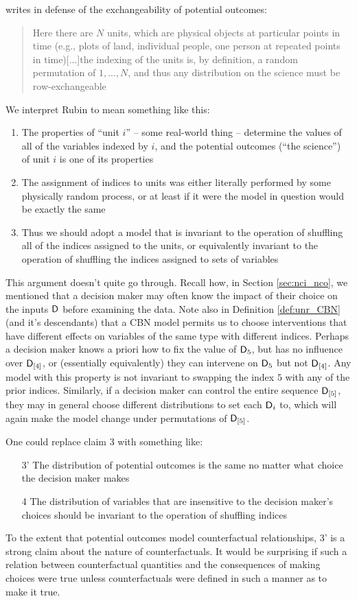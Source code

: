 \citet{rubin_causal_2005} writes in defense of the exchangeability of potential outcomes:
\begin{quote}
    Here there are $N$ units, which are physical objects at particular points in time (e.g., plots of land, individual people, one person at repeated points in time)[...]the indexing of the units is, by definition, a random permutation of $1,..., N$, and thus any distribution on the science must be row-exchangeable
\end{quote}
We interpret Rubin to mean something like this:
\begin{enumerate}
    \item The properties of ``unit $i$'' -- some real-world thing -- determine the values of all of the variables indexed by $i$, and the potential outcomes (``the science'') of unit $i$ is one of its properties
    \item The assignment of indices to units was either literally performed by some physically random process, or at least if it were the model in question would be exactly the same
    \item Thus we should adopt a model that is invariant to the operation of shuffling all of the indices assigned to the units, or equivalently invariant to the operation of shuffling the indices assigned to sets of variables
\end{enumerate}
This argument doesn't quite go through. Recall how, in Section \ref{sec:nci_nco}, we mentioned that a decision maker may often know the impact of their choice on the inputs $\mathsf{D}$ before examining the data. Note also in Definition \ref{def:unr_CBN} (and it's descendants) that a CBN model permits us to choose interventions that have different effects on variables of the same type with different indices. Perhaps a decision maker knows a priori how to fix the value of $\mathsf{D}_5$, but has no influence over $\mathsf{D}_{[4]}$, or (essentially equivalently) they can intervene on $\mathsf{D}_5$ but not $\mathsf{D}_{[4]}$. Any model with this property is not invariant to swapping the index $5$ with any of the prior indices. Similarly, if a decision maker can control the entire sequence $\mathsf{D}_{[5]}$, they may in general choose different distributions to set each $\mathsf{D}_i$ to, which will again make the model change under permutations of $\mathsf{D}_{[5]}$.

One could replace claim 3 with something like:
\begin{enumerate}
    \item[3'] The distribution of potential outcomes is the same no matter what choice the decision maker makes
    \item[4] The distribution of variables that are insensitive to the decision maker's choices should be invariant to the operation of shuffling indices
\end{enumerate}
To the extent that potential outcomes model counterfactual relationships, 3' is a strong claim about the nature of counterfactuals. It would be surprising if such a relation between counterfactual quantities and the consequences of making choices were true unless counterfactuals were defined in such a manner as to make it true.


